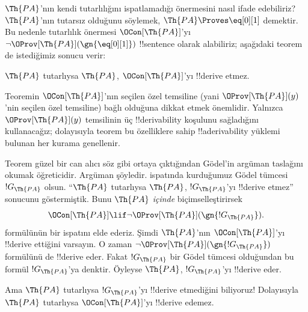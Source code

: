 



$\Th{PA}$'nın kendi tutarlılığını ispatlamadığı önermesini nasıl ifade
edebiliriz? $\Th{PA}$'nın tutarsız olduğunu söylemek,
$\Th{PA} \Proves \eq[0][1]$ demektir. Bu nedenle tutarlılık önermesi
$\OCon[\Th{PA}]$'yı $\lnot \OProv[\Th{PA}](\gn{\eq[0][1]})$ !!{sentence}
olarak alabiliriz; aşağıdaki teorem de istediğimiz sonucu verir:

\begin{thm}
$\Th{PA}$ tutarlıysa $\Th{PA}$, $\OCon[\Th{PA}]$'yı !!{derive} etmez.
\end{thm}

Teoremin $\OCon[\Th{PA}]$'nın seçilen özel temsiline (yani
$\OProv[\Th{PA}](y)$'nin seçilen özel temsiline) bağlı olduğuna dikkat etmek
önemlidir. Yalnızca $\OProv[\Th{PA}](y)$ temsilinin üç !!{derivability}
koşulunu sağladığını kullanacağız; dolayısıyla teorem bu özelliklere sahip
!!a{derivability} yüklemi bulunan her kurama genellenir.

Teorem güzel bir can alıcı söz gibi ortaya çıktığından G\"odel'in argüman
taslağını okumak öğreticidir. Argüman şöyledir.
 ispatında kurduğumuz G\"odel tümcesi
$!G_\Th{PA}$ olsun. ``$\Th{PA}$ tutarlıysa $\Th{PA}$, $!G_\Th{PA}$'yı
!!{derive} etmez'' sonucunu göstermiştik. Bunu $\Th{PA}$ \emph{içinde}
biçimselleştirirsek
\[
\OCon[\Th{PA}] \lif \lnot \OProv[\Th{PA}](\gn{!G_\Th{PA}}).
\]
formülünün bir ispatını elde ederiz. Şimdi $\Th{PA}$'nın
$\OCon[\Th{PA}]$'yı !!{derive} ettiğini varsayın. O zaman
$\lnot \OProv[\Th{PA}](\gn{!G_\Th{PA}})$ formülünü de !!{derive} eder. Fakat
$!G_\Th{PA}$ bir G\"odel tümcesi olduğundan bu formül $!G_\Th{PA}$'ya
denktir. Öyleyse $\Th{PA}$, $!G_\Th{PA}$'yı !!{derive} eder.

Ama $\Th{PA}$ tutarlıysa $!G_\Th{PA}$'yı !!{derive} etmediğini biliyoruz!{}
Dolayısıyla $\Th{PA}$ tutarlıysa $\OCon[\Th{PA}]$'yı !!{derive} edemez.

